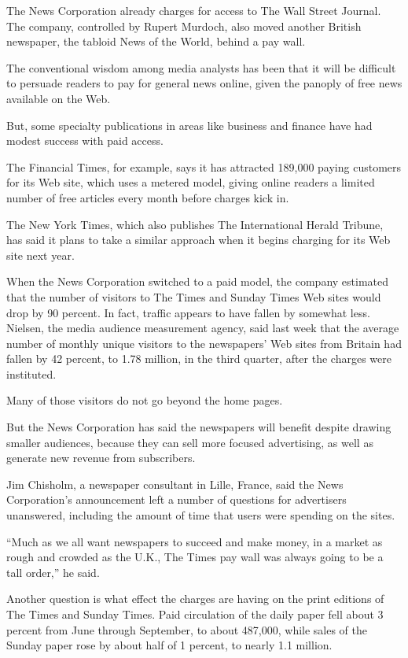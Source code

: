 ﻿\documentclass[12pt]{article}
\begin{document}
The News Corporation already charges for access to The Wall Street Journal. The company, controlled
by Rupert Murdoch, also moved another British newspaper, the tabloid News of the World, behind a pay
wall.

The conventional wisdom among media analysts has been that it will be difficult to persuade readers
to pay for general news online, given the panoply of free news available on the Web.

But, some specialty publications in areas like business and finance have had modest success with
paid access.

The Financial Times, for example, says it has attracted 189,000 paying customers for its Web site,
which uses a metered model, giving online readers a limited number of free articles every month
before charges kick in.

The New York Times, which also publishes The International Herald Tribune, has said it plans to take
a similar approach when it begins charging for its Web site next year.

When the News Corporation switched to a paid model, the company estimated that the number of
visitors to The Times and Sunday Times Web sites would drop by 90 percent. In fact, traffic appears
to have fallen by somewhat less. Nielsen, the media audience measurement agency, said last week that
the average number of monthly unique visitors to the newspapers' Web sites from Britain had fallen
by 42 percent, to 1.78 million, in the third quarter, after the charges were instituted.

Many of those visitors do not go beyond the home pages.

But the News Corporation has said the newspapers will benefit despite drawing smaller audiences,
because they can sell more focused advertising, as well as generate new revenue from subscribers.

Jim Chisholm, a newspaper consultant in Lille, France, said the News Corporation's announcement left
a number of questions for advertisers unanswered, including the amount of time that users were
spending on the sites.

``Much as we all want newspapers to succeed and make money, in a market as rough and crowded as the
U.K., The Times pay wall was always going to be a tall order,'' he said.

Another question is what effect the charges are having on the print editions of The Times and Sunday
Times. Paid circulation of the daily paper fell about 3 percent from June through September, to
about 487,000, while sales of the Sunday paper rose by about half of 1 percent, to nearly 1.1
million.
\end{document}
